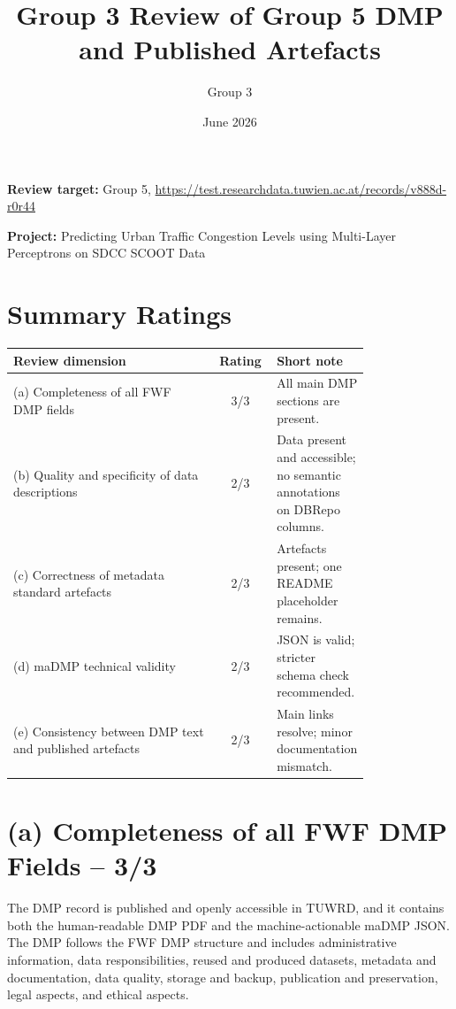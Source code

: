 \documentclass[11pt,a4paper]{article}
\title{\vspace{-1.5em}Group 3 Review of Group 5 DMP and Published Artefacts}
\author{Group 3}
\date{June 2026}
\begin{document}
\maketitle
\vspace{-1.5em}

\textbf{Review target:} Group 5, \url{https://test.researchdata.tuwien.ac.at/records/v888d-r0r44}

\textbf{Project:} Predicting Urban Traffic Congestion Levels using Multi-Layer Perceptrons on SDCC SCOOT Data

\section*{Summary Ratings}

\begin{center}
\begin{tabular}{|p{0.58\linewidth}|c|p{0.22\linewidth}|}
\hline
\textbf{Review dimension} & \textbf{Rating} & \textbf{Short note} \\
\hline
(a) Completeness of all FWF DMP fields & 3/3 & All main DMP sections are present. \\
\hline
(b) Quality and specificity of data descriptions & 2/3 & Data present and accessible; no semantic annotations on DBRepo columns. \\
\hline
(c) Correctness of metadata standard artefacts & 2/3 & Artefacts present; one README placeholder remains. \\
\hline
(d) maDMP technical validity & 2/3 & JSON is valid; stricter schema check recommended. \\
\hline
(e) Consistency between DMP text and published artefacts & 2/3 & Main links resolve; minor documentation mismatch. \\
\hline
\end{tabular}
\end{center}

\section*{(a) Completeness of all FWF DMP Fields -- 3/3}

The DMP record is published and openly accessible in TUWRD, and it contains both the human-readable DMP PDF and the machine-actionable maDMP JSON. The DMP follows the FWF DMP structure and includes administrative information, data responsibilities, reused and produced datasets, metadata and documentation, data quality, storage and backup, publication and preservation, legal aspects, and ethical aspects.
\end{document}
